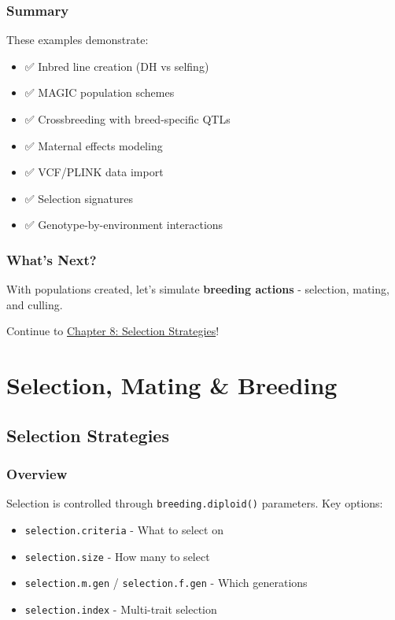 \documentclass[
  letterpaper,
]{book}
\providecommand{\tightlist}{%
  \setlength{\itemsep}{0pt}\setlength{\parskip}{0pt}}
\begin{document}
\section{Summary}\label{summary-6}

These examples demonstrate:

\begin{itemize}
\tightlist
\item
  ✅ Inbred line creation (DH vs selfing)
\item
  ✅ MAGIC population schemes
\item
  ✅ Crossbreeding with breed-specific QTLs
\item
  ✅ Maternal effects modeling
\item
  ✅ VCF/PLINK data import
\item
  ✅ Selection signatures
\item
  ✅ Genotype-by-environment interactions
\end{itemize}

\section{What's Next?}\label{whats-next-5}

With populations created, let's simulate \textbf{breeding actions} -
selection, mating, and culling.

Continue to \href{08-selection-strategies.qmd}{Chapter 8: Selection
Strategies}!

\part{Selection, Mating \& Breeding}

\chapter{Selection Strategies}\label{sec-selection-strategies}

\section{Overview}\label{overview-1}

Selection is controlled through \texttt{breeding.diploid()} parameters.
Key options:

\begin{itemize}
\tightlist
\item
  \texttt{selection.criteria} - What to select on
\item
  \texttt{selection.size} - How many to select
\item
  \texttt{selection.m.gen} / \texttt{selection.f.gen} - Which
  generations
\item
  \texttt{selection.index} - Multi-trait selection
\end{itemize}
\end{document}

